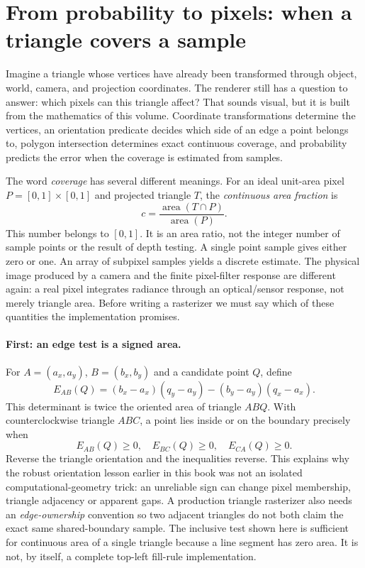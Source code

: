 \clearpage
\section*{From probability to pixels: when a triangle covers a sample}
\noindent Imagine a triangle whose vertices have already been transformed
through object, world, camera, and projection coordinates. The renderer
still has a question to answer: which pixels can this triangle affect?
That sounds visual, but it is built from the mathematics of this volume.
Coordinate transformations determine the vertices, an orientation
predicate decides which side of an edge a point belongs to, polygon
intersection determines exact continuous coverage, and probability
predicts the error when the coverage is estimated from samples.

The word \emph{coverage} has several different meanings. For an ideal
unit-area pixel \(P=[0,1]\times[0,1]\) and projected triangle \(T\),
the \emph{continuous area fraction} is
\[
c=\frac{\operatorname{area}(T\cap P)}
        {\operatorname{area}(P)}.
\]
This number belongs to \([0,1]\). It is an area ratio, not the
integer number of sample points or the result of depth testing.
A single point sample gives either zero or one. An array of
subpixel samples yields a discrete estimate. The physical image
produced by a camera and the finite pixel-filter response are
different again: a real pixel integrates radiance through an
optical/sensor response, not merely triangle area.
Before writing a rasterizer we must say which of these quantities
the implementation promises.

\paragraph{First: an edge test is a signed area.}
For \(A=(a_x,a_y)\), \(B=(b_x,b_y)\) and a candidate point \(Q\),
define
\[
E_{AB}(Q)
=(b_x-a_x)(q_y-a_y)-(b_y-a_y)(q_x-a_x).
\]
This determinant is twice the oriented area of triangle \(ABQ\).
With counterclockwise triangle \(ABC\), a point lies inside or on
the boundary precisely when
\[
E_{AB}(Q)\ge0,\quad
E_{BC}(Q)\ge0,\quad
E_{CA}(Q)\ge0.
\]
Reverse the triangle orientation and the inequalities reverse.
This explains why the robust orientation lesson earlier in this
book was not an isolated computational-geometry trick: an
unreliable sign can change pixel membership, triangle adjacency
or apparent gaps. A production triangle rasterizer also needs
an \emph{edge-ownership} convention so two adjacent triangles do
not both claim the exact same shared-boundary sample. The
inclusive test shown here is sufficient for continuous area of
a single triangle because a line segment has zero area.
It is not, by itself, a complete top-left fill-rule implementation.


